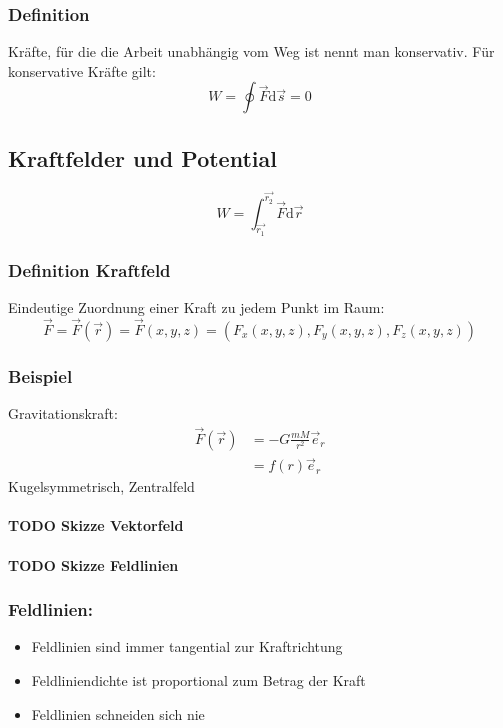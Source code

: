\documentclass[a4paper]{scrartcl}
\renewcommand{\d}{\mathrm{d}}
\renewcommand{\v}[1]{\vec{#1}}
\theoremstyle{definition}
\theoremstyle{plain}
\theoremstyle{plain}
\theoremstyle{remark}
\theoremstyle{remark}
\theoremstyle{remark}
\begin{document}
\subsubsection{Definition}
\label{sec-4-8-1}
Kräfte, für die die Arbeit unabhängig vom Weg ist nennt man konservativ.
Für konservative Kräfte gilt:
\[W=\oint \v F\d \v s = 0\]
\subsection{Kraftfelder und Potential}
\label{sec-4-9}
\[W = \int_{\v{r_1}}^{\v{r_2}}\v F\d \v r\]
\subsubsection{Definition Kraftfeld}
\label{sec-4-9-1}
Eindeutige Zuordnung einer Kraft zu jedem Punkt im Raum:
\[\v F = \v F(\v r) = \v F(x,y,z) = (F_x(x,y,z),F_y(x,y,z),F_z(x,y,z))\]
\subsubsection{Beispiel}
\label{sec-4-9-2}
Gravitationskraft:
\begin{align}
\v F(\v r) &= -G\frac{m M}{r^2}\v e_r \\
&= f(r) \v e_r
\end{align}
Kugelsymmetrisch, Zentralfeld
\paragraph{{\bfseries\sffamily TODO} Skizze Vektorfeld}
\label{sec-4-9-2-1}
\paragraph{{\bfseries\sffamily TODO} Skizze Feldlinien}
\label{sec-4-9-2-2}
\subsubsection{Feldlinien:}
\label{sec-4-9-3}
\begin{itemize}
\item Feldlinien sind immer tangential zur Kraftrichtung
\item Feldliniendichte ist proportional zum Betrag der Kraft
\item Feldlinien schneiden sich nie
\end{itemize}
\end{document}

